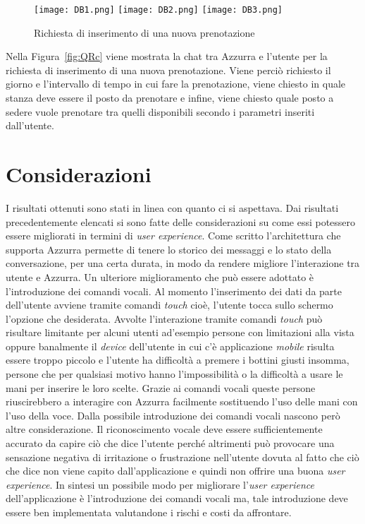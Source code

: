 \begin{figure}[h]
	\begin{center}
		\texttt{[image: DB1.png]}\hfill
		\texttt{[image: DB2.png]}\hfill
		\texttt{[image: DB3.png]}
		\caption{Richiesta di inserimento di una nuova prenotazione}\label{fig:DB}
	\end{center}
\end{figure}

Nella Figura~\ref{fig:QRc} viene mostrata la chat tra Azzurra e l'utente per la richiesta di inserimento di una nuova prenotazione. Viene perciò richiesto il giorno e l'intervallo di tempo in cui fare la prenotazione, viene chiesto in quale stanza deve essere il posto da prenotare e infine, viene chiesto quale posto a sedere vuole prenotare tra quelli disponibili secondo i parametri inseriti dall'utente.

\section{Considerazioni}
I risultati ottenuti sono stati in linea con quanto ci si aspettava. Dai risultati precedentemente elencati si sono fatte delle considerazioni su come essi potessero essere migliorati in termini di \emph{user experience}. Come scritto l'architettura che supporta Azzurra permette di tenere lo storico dei messaggi e lo stato della conversazione, per una certa durata, in modo da rendere migliore l'interazione tra utente e Azzurra. Un ulteriore miglioramento che può essere adottato è l'introduzione dei comandi vocali. Al momento l'inserimento dei dati da parte dell'utente avviene tramite comandi \emph{touch} cioè, l'utente tocca sullo schermo l'opzione che desiderata. Avvolte l'interazione tramite comandi \emph{touch} può risultare limitante per alcuni utenti ad'esempio persone con limitazioni alla vista oppure banalmente il \emph{device} dell'utente in cui c'è applicazione \emph{mobile} risulta essere troppo piccolo e l'utente ha difficoltà a premere i bottini giusti insomma, persone che per qualsiasi motivo hanno l'impossibilità o la difficoltà a usare le mani per inserire le loro scelte. Grazie ai comandi vocali queste persone riuscirebbero a interagire con Azzurra facilmente sostituendo l'uso delle mani con l'uso della voce. Dalla possibile introduzione dei comandi vocali nascono però altre considerazione. Il riconoscimento vocale deve essere sufficientemente accurato da capire ciò che dice l'utente perché altrimenti può provocare una sensazione negativa di irritazione o frustrazione nell'utente dovuta al fatto che ciò che dice non viene capito dall'applicazione e quindi non offrire una buona \emph{user experience}. In sintesi un possibile modo per migliorare l'\emph{user experience} dell'applicazione è l'introduzione dei comandi vocali ma, tale introduzione deve essere ben implementata valutandone i rischi e costi da affrontare.

